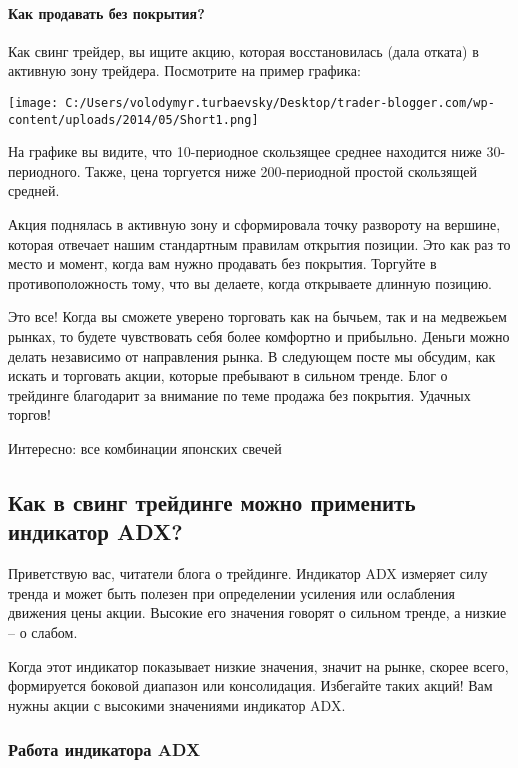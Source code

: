 \documentclass[a5paper]{article}
\begin{document}
\paragraph{Как продавать без покрытия?}

Как свинг трейдер, вы ищите акцию, которая восстановилась (дала
отката) в активную зону трейдера. Посмотрите на пример графика:

\texttt{[image: C:/Users/volodymyr.turbaevsky/Desktop/trader-blogger.com/wp-content/uploads/2014/05/Short1.png]}

На графике вы видите, что 10-периодное скользящее среднее находится ниже 30-периодного. Также, цена торгуется ниже 200-периодной простой скользящей средней.

Акция поднялась в активную зону и сформировала точку развороту на вершине, которая отвечает нашим стандартным правилам открытия позиции. Это как раз то место и момент, когда вам нужно продавать без покрытия. Торгуйте в противоположность тому, что вы делаете, когда открываете длинную позицию.

Это все! Когда вы сможете уверено торговать как на бычьем, так и на медвежьем рынках, то будете чувствовать себя более комфортно и прибыльно. Деньги можно делать независимо от направления рынка. В следующем посте мы обсудим, как искать и торговать акции, которые пребывают в сильном тренде. Блог о трейдинге благодарит за внимание по теме продажа без покрытия. Удачных торгов!


Интересно: все комбинации японских свечей

\subsection{Как в свинг трейдинге можно применить индикатор ADX?}

Приветствую вас, читатели блога о трейдинге. Индикатор ADX измеряет силу тренда и может быть полезен при определении усиления или ослабления движения цены акции. Высокие его значения говорят о сильном тренде, а низкие – о слабом.

Когда этот индикатор показывает низкие значения, значит на рынке,
скорее всего, формируется боковой диапазон или консолидация. Избегайте
таких акций! Вам нужны акции с высокими значениями индикатор ADX.

\subsubsection{Работа индикатора ADX}
\end{document}
